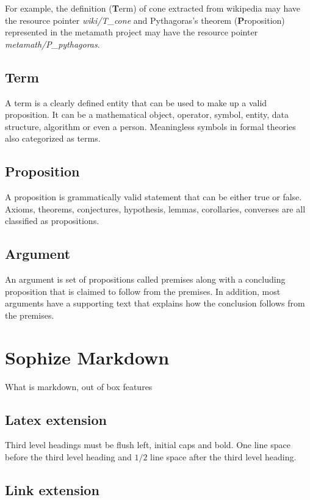 \documentclass[a4paper]{article}
\begin{document}
For example, the definition (\textbf{T}erm) of cone extracted from wikipedia may have the resource pointer \emph{wiki/T\_cone} and Pythagoras's theorem (\textbf{P}roposition) represented in the metamath project may have the resource pointer \emph{metamath/P\_pythagoras}.


\subsection*{Term}
A term is a clearly defined entity that can be used to make up a valid proposition. It can be a mathematical object, operator, symbol, entity, data structure, algorithm or even a person. Meaningless symbols in formal theories also categorized as terms.

\subsection*{Proposition}
A proposition is grammatically valid statement that can be either true or false. Axioms, theorems, conjectures, hypothesis, lemmas, corollaries, converses are all classified as propositions.

\subsection*{Argument}
An argument is set of propositions called premises along with a concluding proposition that is claimed to follow from the premises. In addition, most arguments have a supporting text that explains how the conclusion follows from the premises.


\section{Sophize Markdown}

What is markdown, out of box features

\subsection{Latex extension}

Third level headings must be flush left, initial caps and bold.
One line space before the third level heading and $1/2$ line
space after the third level heading.

\subsection{Link extension}
\end{document}
